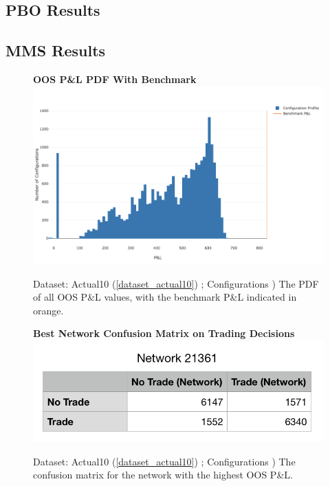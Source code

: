 \documentclass[a4paper,11pt,oneside]{article}
\theoremstyle{plain}
\theoremstyle{definition}
\begin{document}


\subsection{PBO Results}

\newpage
\subsection{MMS Results}


\begin{figure}[H]
	\centering 
	\textbf{OOS P\&L PDF With Benchmark}
	\includegraphics[scale=0.35]{images/results/mms/pl_pdf.png} 
	\caption{Dataset: Actual10 (\ref{dataset_actual10}) ; Configurations )
		\newline The PDF of all OOS P\&L values, with the benchmark P\&L indicated in orange.}
	\label{figure-results_pl_pdf}
\end{figure}


\begin{figure}[H]
	\centering 
	\textbf{Best Network Confusion Matrix on Trading Decisions}
	\includegraphics[scale=0.9]{images/results/mms/best_network_confusion.png} 
	\caption{Dataset: Actual10 (\ref{dataset_actual10}) ; Configurations )
		\newline The confusion matrix for the network with the highest OOS P\&L.}
	\label{figure-results_confusion}
\end{figure}
\end{document}
